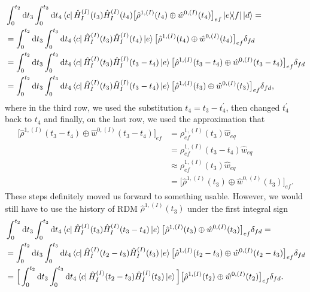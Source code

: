 \begin{equation}
    \begin{aligned}
    &\int_{0}^{t_2} \mathrm{d} t_3 \int_{0}^{t_3} \mathrm{d} t_4 \bra{c}\hat{H}_{I}^{(I)}(t_3) \hat{H}_{I}^{(I)}(t_4) \big[\hat{\rho}^{1, (I)}(t_4) \oplus \hat{w}^{0, (I)}(t_4)\big]_{ef} \ketbra{e}{f} \ket{d}  = \\
    &= \int_{0}^{t_2} \mathrm{d} t_3 \int_{0}^{t_3} \mathrm{d} t_4 \bra{c}\hat{H}_{I}^{(I)}(t_3) \hat{H}_{I}^{(I)}(t_4) \ket{e}\big[\hat{\rho}^{1, (I)}(t_4) \oplus \hat{w}^{0, (I)}(t_4)\big]_{ef} \delta_{fd} \\
    &= \int_{0}^{t_2} \mathrm{d} t_3 \int_{0}^{t_3} \mathrm{d} t_4 \bra{c}\hat{H}_{I}^{(I)}(t_3) \hat{H}_{I}^{(I)}(t_3 - t_4) \ket{e}\big[\hat{\rho}^{1, (I)}(t_3 - t_4) \oplus \hat{w}^{0, (I)}(t_3 - t_4)\big]_{ef} \delta_{fd} \\
    &= \int_{0}^{t_2} \mathrm{d} t_3 \int_{0}^{t_3} \mathrm{d} t_4 \bra{c}\hat{H}_{I}^{(I)}(t_3) \hat{H}_{I}^{(I)}(t_3 - t_4) \ket{e}\big[\hat{\rho}^{1, (I)}(t_3) \oplus \hat{w}^{0, (I)}(t_3)\big]_{ef} \delta_{fd}, \\
    \end{aligned} 
\end{equation}
where in the third row, we used the substitution $t_4 = t_3 - t_4^\prime$, then changed $t_4^\prime$ back to $t_4$ and finally, on the last row, we used the approximation that 
\begin{equation}
    \begin{aligned}
    \big[\hat{\rho}^{1, (I)}(t_3 - t_4) \oplus \hat{w}^{0, (I)}(t_3 - t_4)\big]_{ef} &= \rho^{1, (I)}_{ef}(t_3) \hat{w}_{eq}  \\
    &= \rho^{1, (I)}_{ef}(t_3 - t_4) \hat{w}_{eq} \\
    &\approx \rho^{1, (I)}_{ef}(t_3) \hat{w}_{eq} \\
    &= \big[\hat{\rho}^{1, (I)}(t_3) \oplus \hat{w}^{0, (I)}(t_3)\big]_{ef}.
    \end{aligned} 
\end{equation}
These steps definitely moved us forward to something usable. However, we would still have to use the history of RDM $\hat{\rho}^{1, (I)}(t_3)$ under the first integral sign
\begin{equation}
    \begin{aligned}
    &\int_{0}^{t_2} \mathrm{d} t_3 \int_{0}^{t_3} \mathrm{d} t_4 \bra{c}\hat{H}_{I}^{(I)}(t_3) \hat{H}_{I}^{(I)}(t_3 - t_4) \ket{e}\big[\hat{\rho}^{1, (I)}(t_3) \oplus \hat{w}^{0, (I)}(t_3)\big]_{ef} \delta_{fd} = \\
    &= \int_{0}^{t_2} \mathrm{d} t_3 \int_{0}^{t_3} \mathrm{d} t_4 \bra{c}\hat{H}_{I}^{(I)}(t_2 - t_3) \hat{H}_{I}^{(I)}(t_3) \ket{e}\big[\hat{\rho}^{1, (I)}(t_2 - t_3) \oplus \hat{w}^{0, (I)}(t_2 - t_3)\big]_{ef} \delta_{fd} \\
    &= \Big[\int_{0}^{t_2} \mathrm{d} t_3 \int_{0}^{t_3} \mathrm{d} t_4 \bra{c}\hat{H}_{I}^{(I)}(t_2 - t_3) \hat{H}_{I}^{(I)}(t_3) \ket{e} \Big]\big[\hat{\rho}^{1, (I)}(t_2) \oplus \hat{w}^{0, (I)}(t_2)\big]_{ef} \delta_{fd}. \\
    \end{aligned} 
\end{equation}
